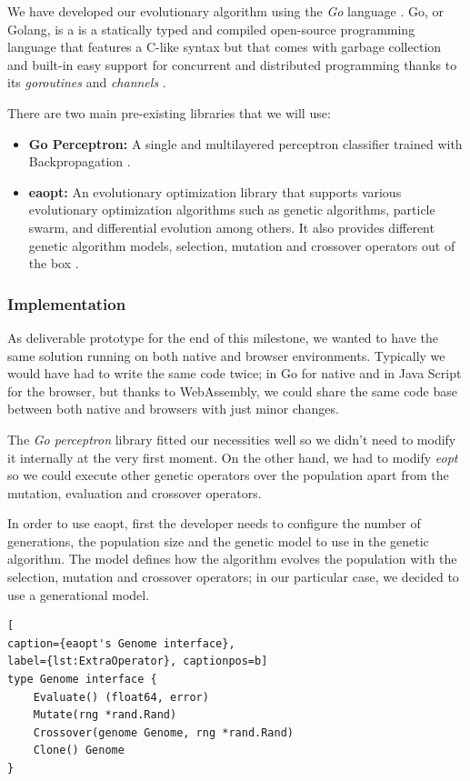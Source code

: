 We have developed our evolutionary algorithm using the \textit{Go} language \cite{go}. Go, or Golang, is a is a statically typed and compiled open-source programming language that features a C-like syntax but that comes with garbage collection and built-in easy support for concurrent and distributed programming thanks to its \textit{goroutines} \cite{channels} and \textit{channels} \cite{channels}.

There are two main pre-existing libraries that we will use:

\begin{itemize}
	\item \textbf{Go Perceptron:} A single and multilayered perceptron classifier trained with Backpropagation \cite{go-perceptron-go}.
	\item \textbf{eaopt:} An evolutionary optimization library that supports various evolutionary optimization algorithms such as genetic algorithms, particle swarm, and differential evolution among others. It also provides different genetic algorithm models, selection, mutation and crossover operators out of the box \cite{eaopt}.
\end{itemize}

\subsubsection*{Implementation}
As deliverable prototype for the end of this milestone, we wanted to have the same solution running on both native and browser environments. Typically we would have had to write the same code twice; in Go for native and in Java Script for the browser, but thanks to WebAssembly, we could share the same code base between both native and browsers with just minor changes.

The \textit{Go perceptron} library fitted our necessities well so we didn't need to modify it internally at the very first moment. On the other hand, we had to modify \textit{eopt} so we could execute other genetic operators over the population apart from the mutation, evaluation and crossover operators.

In order to use eaopt, first the developer needs to configure the number of generations, the population size and the genetic model to use in the genetic algorithm. The model defines how the algorithm evolves the population with the selection, mutation and crossover operators; in our particular case, we decided to use a generational model.

\begin{lstlisting}[
caption={eaopt's Genome interface},
label={lst:ExtraOperator}, captionpos=b]
type Genome interface {
	Evaluate() (float64, error)
	Mutate(rng *rand.Rand)
	Crossover(genome Genome, rng *rand.Rand)
	Clone() Genome
}
\end{lstlisting}

